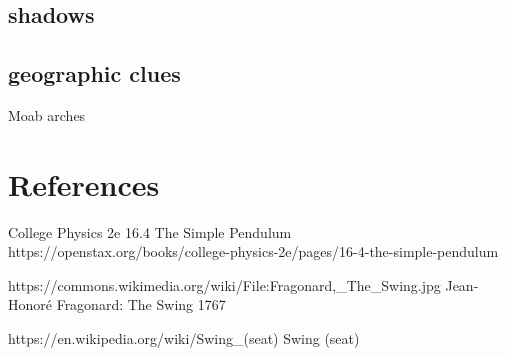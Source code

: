 \documentclass[12pt]{iopart}
\begin{document}
\subsection{shadows}

\subsection{geographic clues}
Moab arches

\clearpage
\section*{References}
\begin{thebibliography}{99}

College Physics 2e
16.4 The Simple Pendulum
https://openstax.org/books/college-physics-2e/pages/16-4-the-simple-pendulum

	https://commons.wikimedia.org/wiki/File:Fragonard,\_The\_Swing.jpg
	Jean-Honoré Fragonard: The Swing 
	1767

	https://en.wikipedia.org/wiki/Swing\_(seat)
		Swing (seat)

\end{thebibliography}
\end{document}
